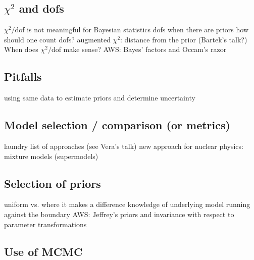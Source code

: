 \subsection{\texorpdfstring{$\chi^2$}{chi-squared} and dofs}  \label{subsec:}

   \bi 
       \I $\chi^2/$dof is not meaningful for Bayesian statistics
       \I dofs when there are priors
       \I how should one count dofs?
       \I augmented $\chi^2$: distance from the prior (Bartek's talk?)
       \I When does $\chi^2/$dof make sense?
       \I AWS: Bayes' factors and Occam's razor
   \ei    

\subsection{Pitfalls}  \label{subsec:pitfalls}

  \bi
    \I using same data to estimate priors and determine uncertainty
  \ei


\subsection{Model selection / comparison (or metrics)}  \label{subsec:model_comparison}

  \bi
    \I laundry list of approaches (see Vera's talk)
    \I new approach for nuclear physics: mixture models (supermodels)
  \ei


\subsection{Selection of priors}  \label{subsec:selecting_priors}

  \bi
    \I uniform vs. where it makes a difference
    \I knowledge of underlying model 
    \I running against the boundary
    \I AWS: Jeffrey's priors and invariance with respect to
    parameter transformations
  \ei


\subsection{Use of MCMC}  \label{subsec:using_mcmc}

